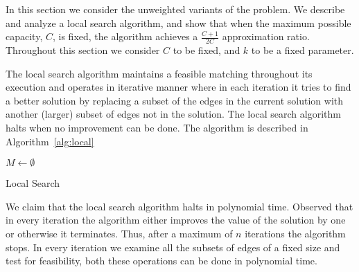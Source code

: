 In this section we consider the unweighted variants of the problem.
We describe and analyze a local search algorithm, 
and show that when the maximum possible capacity, $C$, is fixed, the algorithm achieves 
a $\frac{C + 1}{2C}$ approximation ratio.
Throughout this section we consider $C$ to be fixed, and $k$ to be a fixed parameter.  

The local search algorithm maintains a feasible matching throughout its execution
and operates in 
iterative manner where in each iteration it tries to find a better solution by
replacing a subset of the edges in the current solution with 
another (larger) subset of edges not in the solution.
The local search algorithm halts when no improvement can be done.
The algorithm is described in Algorithm~\ref{alg:local} 

\begin{algorithm}
$M \leftarrow \emptyset$								\\

\caption{
\label{alg:local}
Local Search}
\end{algorithm}


We claim that the local search algorithm halts in polynomial time.
Observed that in every iteration the algorithm either improves the value of the solution
by one or otherwise it terminates. 
Thus, after a maximum of $n$ iterations the algorithm stops.
In every iteration we examine all the subsets of edges of a fixed size and test for feasibility,
both these operations can be done in polynomial time. 